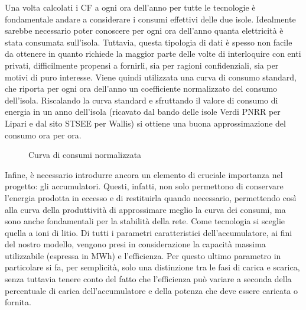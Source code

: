 \documentclass[fleqn,11pt]{SelfArx} %
\begin{document}
Una volta calcolati i CF a ogni ora dell'anno per tutte le tecnologie è fondamentale andare a considerare i consumi effettivi delle due isole.
Idealmente sarebbe necessario poter conoscere per ogni ora dell'anno quanta elettricità è stata consumata sull'isola. Tuttavia, questa tipologia di dati è spesso non facile da ottenere in quanto richiede la maggior parte delle volte di interloquire con enti privati, difficilmente propensi a fornirli, sia per ragioni confidenziali, sia per motivi di puro interesse.
Viene quindi utilizzata una curva di consumo standard, che riporta per ogni ora dell'anno un coefficiente normalizzato del consumo dell'isola. Riscalando la curva standard e sfruttando il valore di consumo di energia in un anno dell'isola (ricavato dal bando delle isole Verdi PNRR per Lipari e dal sito STSEE per Wallis) si ottiene una buona approssimazione del consumo ora per ora. 
\begin{figure*}[ht]\centering
	\caption{Curva di consumi normalizzata}
	\label{fig:consumption}
\end{figure*}

Infine, è necessario introdurre ancora un elemento di cruciale importanza nel progetto: gli accumulatori.
Questi, infatti, non solo permettono di conservare l'energia prodotta in eccesso e di restituirla quando necessario, permettendo così alla curva della produttività di approssimare meglio la curva dei consumi, ma sono anche fondamentali per la stabilità della rete.
Come tecnologia si sceglie quella a ioni di litio. 
Di tutti i parametri caratteristici dell'accumulatore, ai fini del nostro modello, vengono presi in
considerazione la capacità massima utilizzabile (espressa in MWh) e l'efficienza.
Per questo ultimo parametro in particolare si fa, per semplicità, solo una distinzione tra le fasi di carica e scarica, senza tuttavia tenere conto del fatto che l'efficienza può variare a seconda della percentuale di carica dell'accumulatore e della potenza che deve essere caricata o fornita. 
\end{document}
